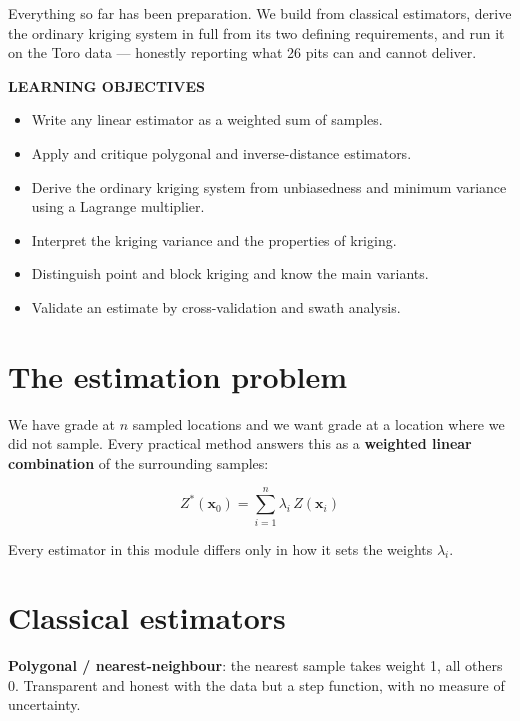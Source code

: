 \documentclass[11pt]{article}
\begin{document}

Everything so far has been preparation. We build from classical
estimators, derive the ordinary kriging system in full from its two
defining requirements, and run it on the Toro data --- honestly reporting
what 26 pits can and cannot deliver.

\begin{objbox}
{\sffamily\bfseries\color{bronze}LEARNING OBJECTIVES}
\begin{itemize}[leftmargin=14pt,itemsep=2pt]
\item Write any linear estimator as a weighted sum of samples.
\item Apply and critique polygonal and inverse-distance estimators.
\item Derive the ordinary kriging system from unbiasedness and minimum
variance using a Lagrange multiplier.
\item Interpret the kriging variance and the properties of kriging.
\item Distinguish point and block kriging and know the main variants.
\item Validate an estimate by cross-validation and swath analysis.
\end{itemize}
\end{objbox}

\section{The estimation problem}

We have grade at $n$ sampled locations and we want grade at a location
where we did not sample. Every practical method answers this as a
\textbf{weighted linear combination} of the surrounding samples:

\begin{eqbox}
\[ Z^{*}(\mathbf{x}_0) = \sum_{i=1}^{n}\lambda_i\,Z(\mathbf{x}_i)
   \tag{5.1}\]
\end{eqbox}

Every estimator in this module differs only in how it sets the weights
$\lambda_i$.

\section{Classical estimators}

\textbf{Polygonal / nearest-neighbour}: the nearest sample takes weight
1, all others 0. Transparent and honest with the data but a step
function, with no measure of uncertainty.
\end{document}
